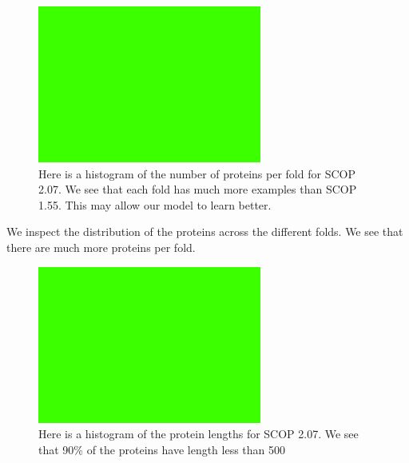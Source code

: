 \documentclass[12pt, a4paper, twocolumn, fullpage]{article}
\theoremstyle{plain}
\theoremstyle{definition}
\theoremstyle{remark}
\begin{document}
\begin{figure}
    \includegraphics[width=\linewidth]{img/blank.png}
    \caption{Here is a histogram of the number of proteins per fold for SCOP 2.07. We see that each fold has much more examples than SCOP 1.55. This may allow our model to learn better.}
    \label{numproteinfold2.07}
\end{figure}

We inspect the distribution of the proteins across the different folds. We see that there are much more proteins per fold.

\begin{figure}
    \includegraphics[width=\linewidth]{img/blank.png}
    \caption{Here is a histogram of the protein lengths for SCOP 2.07. We see that 90\% of the proteins have length less than 500}
    \label{chainlength2.07}
\end{figure}
\end{document}
